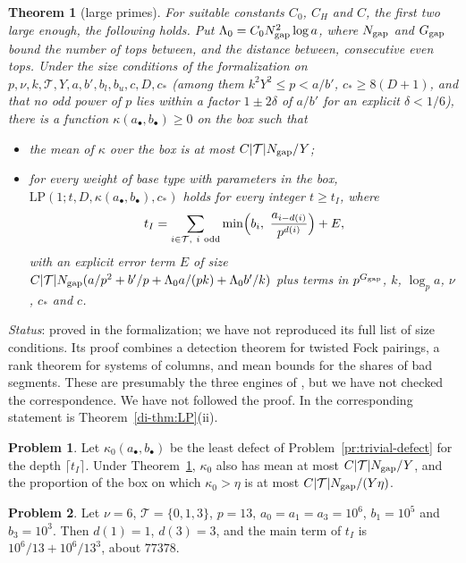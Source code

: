\documentclass[reqno]{amsart}
\theoremstyle{definition}
\newtheorem{problem}{Problem}[section]
\theoremstyle{plain}
\newtheorem{theorem}{Theorem}[section]
\theoremstyle{remark}
\newcommand{\LP}{\mathrm{LP}}
\begin{document}
\begin{theorem}[large primes]\label{thm:classI}
For suitable constants \(C_0\), \(C_H\) and \(C\), the first two large enough, the following holds.  Put \(\Lambda_0=C_0N_{\rm gap}^2\log a\), where \(N_{\rm gap}\) and \(G_{\rm gap}\) bound the number of tops between, and the distance between, consecutive even tops.  Under the size conditions of the formalization on \(p,\nu,k,\mathcal T,Y,a,b',b_l,b_u,c,D,c_*\) (among them \(k^2Y^2\le p<a/b'\), \(c_*\ge8(D+1)\), and that no odd power of \(p\) lies within a factor \(1\pm2\delta\) of \(a/b'\) for an explicit \(\delta<1/6\)), there is a function \(\kappa(a_\bullet,b_\bullet)\ge0\) on the box such that
\begin{itemize}
\item[(a)] the mean of \(\kappa\) over the box is at most \(C\lvert\mathcal T\rvert N_{\rm gap}/Y\);
\item[(b)] for every weight of base type with parameters in the box, \(\LP(1;t,D,\kappa(a_\bullet,b_\bullet),c_*)\) holds for every integer \(t\ge t_I\), where
\[
 t_I=\sum_{i\in\mathcal T,\ i\ \text{odd}}\min\Bigl(b_i,\ \frac{a_{i-d(i)}}{p^{d(i)}}\Bigr)+E ,
\]
with an explicit error term \(E\) of size \(C\lvert\mathcal T\rvert N_{\rm gap}(a/p^2+b'/p+\Lambda_0a/(pk)+\Lambda_0b'/k)\) plus terms in \(p^{G_{\rm gap}}\), \(k\), \(\log_pa\), \(\nu\), \(c_*\) and \(c\).
\end{itemize}
\end{theorem}

\noindent\emph{Status}: proved in the formalization; we have not reproduced its full list of size conditions.  Its proof combines a detection theorem for twisted Fock pairings, a rank theorem for systems of columns, and mean bounds for the shares of bad segments.  These are presumably the three engines of \cite[Hyp.~12.12]{Adr}, but we have not checked the correspondence.  We have not followed the proof.  In \cite{Adr} the corresponding statement is Theorem~\ref{di-thm:LP}(ii).

\begin{problem}\label{pr:least}
Let \(\kappa_0(a_\bullet,b_\bullet)\) be the least defect of Problem~\ref{pr:trivial-defect} for the depth \(\lceil t_I\rceil\).  Under Theorem~\ref{thm:classI}, \(\kappa_0\) also has mean at most \(C\lvert\mathcal T\rvert N_{\rm gap}/Y\), and the proportion of the box on which \(\kappa_0>\eta\) is at most \(C\lvert\mathcal T\rvert N_{\rm gap}/(Y\eta)\).
\end{problem}

\begin{problem}\label{pr:main-term}
Let \(\nu=6\), \(\mathcal T=\{0,1,3\}\), \(p=13\), \(a_0=a_1=a_3=10^6\), \(b_1=10^5\) and \(b_3=10^3\).  Then \(d(1)=1\), \(d(3)=3\), and the main term of \(t_I\) is \(10^6/13+10^6/13^3\), about \(77378\).
\end{problem}
\end{document}
